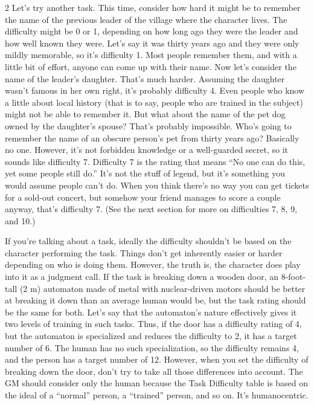 \begin{multicols}{2}
Let’s try another task. This time, consider how hard it might be to remember the name of the previous leader of the village where the character lives. The difficulty might be 0 or 1, depending on how long ago they were the leader and how well known they were. Let’s say it was thirty years ago and they were only mildly memorable, so it’s difficulty 1. Most people remember them, and with a little bit of effort, anyone can come up with their name. Now let’s consider the name of the leader’s daughter. That’s much harder. Assuming the daughter wasn’t famous in her own right, it’s probably difficulty 4. Even people who know a little about local history (that is to say, people who are trained in the subject) might not be able to remember it. But what about the name of the pet dog owned by the daughter’s spouse? That’s probably impossible. Who’s going to remember the name of an obscure person’s pet from thirty years ago? Basically no one. However, it’s not forbidden knowledge or a well-guarded secret, so it sounds like difficulty 7. Difficulty 7 is the rating that means “No one can do this, yet some people still do.” It’s not the stuff of legend, but it’s something you would assume people can’t do. When you think there’s no way you can get tickets for a sold-out concert, but somehow your friend manages to score a couple anyway, that’s difficulty 7. (See the next section for more on difficulties 7, 8, 9, and 10.)

If you’re talking about a task, ideally the difficulty shouldn’t be based on the character performing the task. Things don’t get inherently easier or harder depending on who is doing them. However, the truth is, the character does play into it as a judgment call. If the task is breaking down a wooden door, an 8-foot-tall (2 m) automaton made of metal with nuclear-driven motors should be better at breaking it down than an average human would be, but the task rating should be the same for both. Let’s say that the automaton’s nature effectively gives it two levels of training in such tasks. Thus, if the door has a difficulty rating of 4, but the automaton is specialized and reduces the difficulty to 2, it has a target number of 6. The human has no such specialization, so the difficulty remains 4, and the person has a target number of 12. However, when you set the difficulty of breaking down the door, don’t try to take all those differences into account. The GM should consider only the human because the Task Difficulty table is based on the ideal of a “normal” person, a “trained” person, and so on. It’s humanocentric.


\end{multicols}
